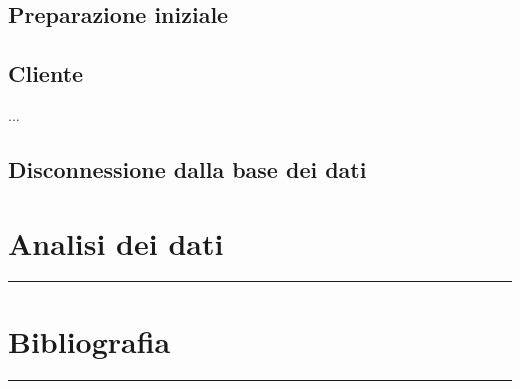 \documentclass[legalpaper]{article}
\begin{document}
\subsection{Preparazione iniziale}
\subsection{Cliente}

...

\subsection{Disconnessione dalla base dei dati}
\newpage
\section{Analisi dei dati}
\rule{\linewidth}{1.5pt}

\newpage

\section{Bibliografia}
\rule{\linewidth}{1.5pt}
\end{document}

